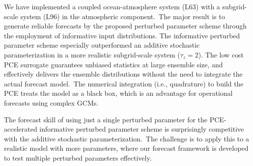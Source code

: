 
	We have implemented a coupled ocean-atmosphere system (L63) with a subgrid-scale 
	system (L96) in the atmospheric component.\
	The major result is to generate reliable forecasts
	by the proposed perturbed parameter scheme through
	the employment of informative input distributions.
	The informative perturbed parameter scheme especially outperformed an additive stochastic 
	parameterization in a more realistic subgrid-scale system ($\tau_z=2$).
	The low cost PCE surrogate guarantees unbiased statistics at large ensemble size,	
	and effectively delivers the ensemble distributions without the need to integrate the actual forecast model.\ 
	The numerical integration (i.e., quadrature) to build the PCE treats the 
	model as a black box, which is an advantage for operational forecasts using complex GCMs.\
	

	
	The forecast skill of using just a single perturbed parameter
	for the PCE-accelerated informative perturbed parameter scheme
	is surprisingly competitive with the additive stochastic parameterization.\ 
	The challenge is to apply this to a realistic model with more parameters,
	where our forecast framework is developed to test multiple perturbed parameters effectively.\


